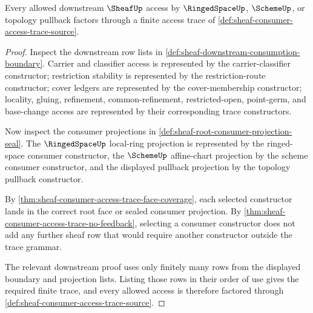 \begin{theorem}
\label{thm:sheaf-consumer-access-trace-exhaustion}
Every allowed downstream $\SheafUp$ access by $\RingedSpaceUp$, $\SchemeUp$, or topology pullback factors through a finite access trace of \autoref{def:sheaf-consumer-access-trace-source}.
\end{theorem}
\begin{proof}
Inspect the downstream row lists in \autoref{def:sheaf-downstream-consumption-boundary}. Carrier and classifier access is represented by the carrier-classifier constructor; restriction stability is represented by the restriction-route constructor; cover ledgers are represented by the cover-membership constructor; locality, gluing, refinement, common-refinement, restricted-open, point-germ, and base-change access are represented by their corresponding trace constructors.

Now inspect the consumer projections in \autoref{def:sheaf-root-consumer-projection-seal}. The $\RingedSpaceUp$ local-ring projection is represented by the ringed-space consumer constructor, the $\SchemeUp$ affine-chart projection by the scheme consumer constructor, and the displayed pullback projection by the topology pullback constructor.

By \autoref{thm:sheaf-consumer-access-trace-face-coverage}, each selected constructor lands in the correct root face or sealed consumer projection. By \autoref{thm:sheaf-consumer-access-trace-no-feedback}, selecting a consumer constructor does not add any further sheaf row that would require another constructor outside the trace grammar.

The relevant downstream proof uses only finitely many rows from the displayed boundary and projection lists. Listing those rows in their order of use gives the required finite trace, and every allowed access is therefore factored through \autoref{def:sheaf-consumer-access-trace-source}.
\end{proof}
